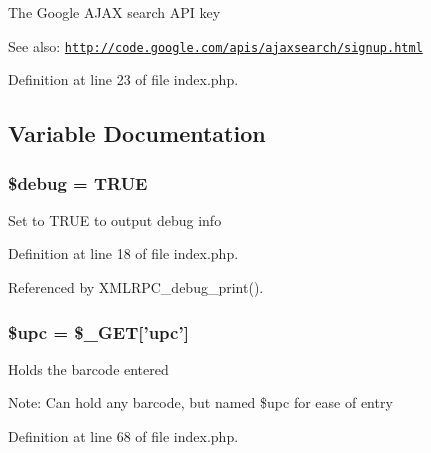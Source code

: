 The Google AJAX search API key \begin{Desc}
\item[See also:]\href{http://code.google.com/apis/ajaxsearch/signup.html}{\tt http://code.google.com/apis/ajaxsearch/signup.html} \end{Desc}


Definition at line 23 of file index.php.

\subsection{Variable Documentation}
\hypertarget{index_8php_85ae3e64cd40e9564adceb010085e9dd}{
\subsubsection{\setlength{\rightskip}{0pt plus 5cm}\$debug = TRUE}}
\label{index_8php_85ae3e64cd40e9564adceb010085e9dd}


Set to TRUE to output debug info 

Definition at line 18 of file index.php.

Referenced by XMLRPC\_\-debug\_\-print().\hypertarget{index_8php_a9aa17ff51d69075d75cfc5bc4e89b34}{
\subsubsection{\setlength{\rightskip}{0pt plus 5cm}\$upc = \$\_\-GET\mbox{[}'upc'\mbox{]}}}
\label{index_8php_a9aa17ff51d69075d75cfc5bc4e89b34}


Holds the barcode entered \begin{Desc}
\item[Note:]Can hold any barcode, but named \$upc for ease of entry \end{Desc}


Definition at line 68 of file index.php.